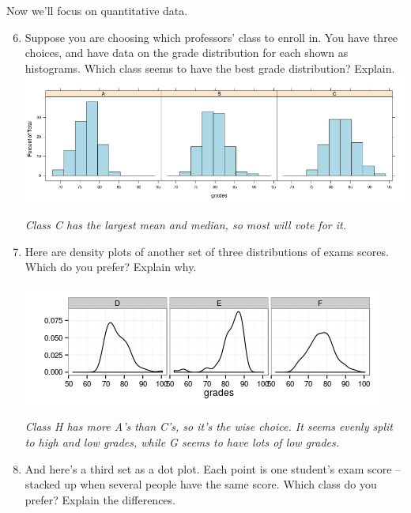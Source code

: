  Now we'll focus on quantitative data.    \vspace{-.3in}
 \begin{enumerate}
\setcounter{enumi}{5}
 \item \label{center}
   Suppose you are choosing which professors' class to enroll
     in.  You have three choices, and have data on the grade
     distribution for each shown as histograms.  
     Which class seems to have the best grade distribution? Explain. \\
  \includegraphics[width = .7\linewidth]{../plots/3classGradeCompareMn.png}
\begin{students}
    \vspace{2cm}    
\end{students}

\begin{key}
  {\it Class C has the largest mean and median, so most will vote for it. }
\end{key}

\item  \label{skew} Here are density plots of  another set of three
  distributions of exams scores. Which do you prefer?  Explain why. 

   \includegraphics[width=.7\linewidth]{../plots/3classGradeCompareSkw.png}
\begin{students}
    \vspace{2cm}   
\end{students}

\begin{key}
  {\it Class H has more A's than C's, so it's the wise choice.  It
    seems evenly split to high and low grades, while G seems to have
    lots of low grades.}
\end{key}

    
   \item  \label{spread}And here's a third set as a dot plot. Each point is one
     student's exam score -- stacked up when several people have the
     same score.   Which class do you prefer?  Explain the
     differences.  
     

\end{enumerate}
